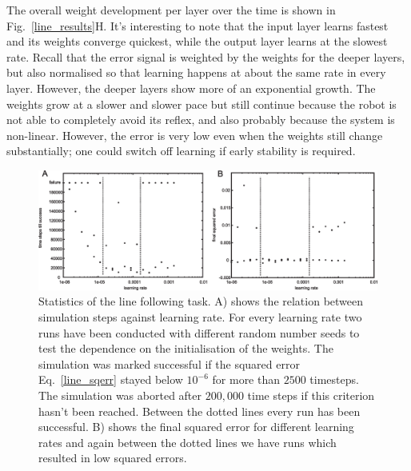 \documentclass{llncs}
\begin{document}
The overall weight development per layer over the time 
is shown in Fig.~\ref{line_results}H. It's interesting to note
that the input layer learns fastest and its weights converge
quickest, while the output layer learns at the slowest rate. Recall 
that the error signal is weighted by the weights for the deeper
layers, but also normalised so that learning happens at about the
same rate in every layer. However, the deeper layers show more
of an exponential growth. The weights grow at a slower
and slower pace but still continue because the robot is not able to completely
avoid its reflex, and also probably because the system is non-linear.
However, the error is very low even when the weights still change
substantially; one could switch off learning if early stability
is required.



\begin{figure}[h!]
  \centering
  \includegraphics[width=\columnwidth]{line_stats}
  \caption{Statistics of the line following task. A) shows the relation between
    simulation steps against learning rate. For every learning rate two runs have
    been conducted with different random number seeds to test the dependence on the
    initialisation of the weights. The simulation was marked successful if the
    squared error Eq.~\ref{line_sqerr} stayed below $10^{-6}$ for more than $2500$
    timesteps. The simulation was aborted after $200,000$ time steps if this criterion
    hasn't been reached. Between the dotted lines every run has been successful.
    B) shows the final squared error for different learning rates and again between
    the dotted lines we have runs which resulted in low squared errors.
    \label{line_stats}}
\end{figure}
\end{document}
